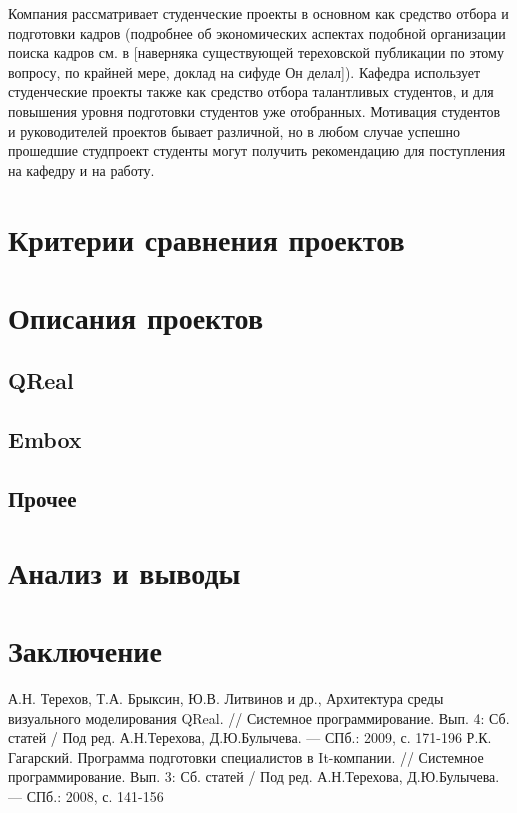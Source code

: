\documentclass[a5paper]{article}
\begin{document}
Компания рассматривает студенческие проекты в основном как средство отбора и подготовки кадров (подробнее об экономических аспектах подобной организации поиска кадров см. в [наверняка существующей тереховской публикации по этому вопросу, по крайней мере, доклад на сифуде Он делал]). Кафедра использует студенческие проекты также как средство отбора талантливых студентов, и для повышения уровня подготовки студентов уже отобранных. Мотивация студентов и руководителей проектов бывает различной, но в любом случае успешно прошедшие студпроект студенты могут получить рекомендацию для поступления на кафедру и на работу.





\section{Критерии сравнения проектов}

\section{Описания проектов}
\subsection{QReal}
\subsection{Embox}
\subsection{Прочее}

\section{Анализ и выводы}

\section*{Заключение}

\pagebreak

\begin{thebibliography}{9000}
   А.Н. Терехов, Т.А. Брыксин, Ю.В. Литвинов и др., Архитектура среды визуального моделирования QReal. // Системное 
программирование. Вып. 4: Сб. статей / Под ред. А.Н.Терехова, Д.Ю.Булычева. --- СПб.: 2009, с. 171-196
   Р.К. Гагарский. Программа подготовки специалистов в It-компании. // Системное 
программирование. Вып. 3: Сб. статей / Под ред. А.Н.Терехова, Д.Ю.Булычева. --- СПб.: 2008, с. 141-156
\end{thebibliography}
  
\end{document}
